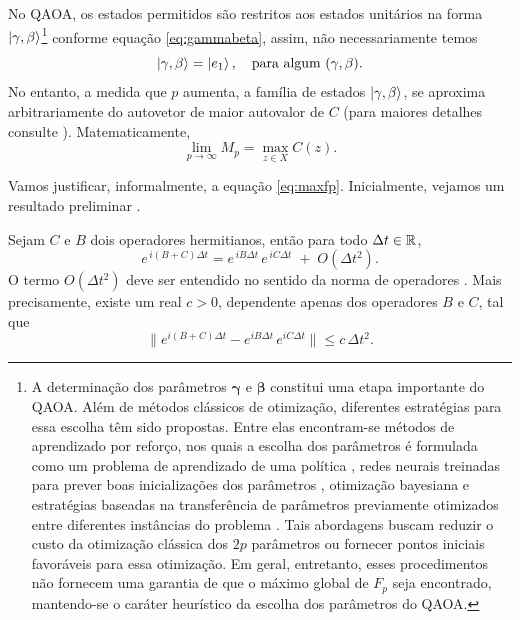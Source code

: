 No QAOA, os estados permitidos são restritos aos estados unitários na forma $\ket{\gamma, \beta}$\footnote{A determinação dos parâmetros $\boldsymbol{\gamma}$ e $\boldsymbol{\beta}$ constitui uma etapa importante do QAOA. Além de métodos clássicos de otimização, diferentes estratégias para essa escolha têm sido propostas. Entre elas encontram-se métodos de aprendizado por reforço, nos quais a escolha dos parâmetros é formulada como um problema de aprendizado de uma política \cite{pmlr-v107-yao20a}, redes neurais treinadas para prever boas inicializações dos parâmetros \cite{Xie_2023}, otimização bayesiana e estratégias baseadas na transferência de parâmetros previamente otimizados entre diferentes instâncias do problema \cite{galda2021transferabilityoptimalqaoaparameters}. Tais abordagens buscam reduzir o custo da otimização clássica dos $2p$ parâmetros ou fornecer pontos iniciais favoráveis para essa otimização. Em geral, entretanto, esses
procedimentos não fornecem uma garantia de que o máximo global de $F_p$ seja encontrado, mantendo-se o caráter heurístico da escolha dos parâmetros do QAOA.} conforme equação \eqref{eq:gammabeta}, assim, não necessariamente temos
\begin{equation}
    \ket{\gamma, \beta} = \ket{e_1}, \quad \text{para algum $(\gamma, \beta)$}.
\end{equation}
No entanto, a medida que $p$ aumenta, a família de estados $\ket{\gamma, \beta}$, se aproxima arbitrariamente do autovetor de maior autovalor de $C$ (para maiores detalhes consulte \cite[seção~VI]{farhi2014quantumapproximateoptimizationalgorithm}). Matematicamente,
\begin{equation}\label{eq:maxfp}
    \lim_{p\to\infty} M_p = \max_{z\in X} C(z).
\end{equation}

Vamos justificar, informalmente, a equação \eqref{eq:maxfp}. Inicialmente, vejamos um resultado preliminar \cite[seção~4.7.2]{nielsen2010quantum}.

\begin{theorem}\label{tm:lt}
    Sejam $C$ e $B$ dois operadores hermitianos, então para todo $\Delta t\in \mathbb{R}$,
    \begin{equation}\label{eq:lt}
        e^{\, i(B+C)\Delta t}=e^{\, iB\Delta t}\,e^{\, iC\Delta t}\;+\; O(\Delta t^{2}).
    \end{equation}
    O termo $O(\Delta t^2)$ deve ser entendido no sentido da norma de operadores \cite[seção~5.6]{horn_johnson_matrix_analysis}. Mais precisamente, existe um real $c > 0$, dependente apenas dos operadores $B$ e $C$, tal que
    $$
        \|e^{i(B+C)\Delta t} - e^{iB\Delta t}\, e^{iC\Delta t}\| \leq  c\, \Delta t^2.
    $$
\end{theorem}

